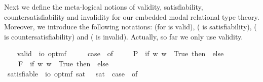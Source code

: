 \begin{isabellebody}
\begin{isamarkuptext}%
Next we define the meta-logical notions of validity, satisfiability, 
  countersatisfiability and invalidity for our embedded modal relational type theory. Moreover, 
  we introduce the following notations: \isa{{\isacharbrackleft}{\isasymphi}{\isacharbrackright}} 
  (for \isa{{\isasymphi}} is valid),  (\isa{{\isasymphi}} is satisfiability),  
  (\isa{{\isasymphi}} is countersatisfiability) and  (\isa{{\isasymphi}} is invalid). Actually, so far 
  we only use validity.%
\end{isamarkuptext}\isamarkuptrue%
\ \ \isamarkupfalse%
\ valid\ {\isacharcolon}{\isacharcolon}\ {\isachardoublequoteopen}io\ opt{\isasymRightarrow}mf{\isachardoublequoteclose}\ {\isacharparenleft}{\isachardoublequoteopen}{\isacharbrackleft}{\isacharunderscore}{\isacharbrackright}{\isachardoublequoteclose}\ {\isacharbrackleft}{}{\isacharbrackright}{\isacharparenright}\ \ {\isachardoublequoteopen}{\isacharbrackleft}{\isasymphi}{\isacharbrackright}\ {\isasymequiv}\ case\ {\isasymphi}\ of\ \isanewline
\ \ \ \ P{\isacharparenleft}{\isasympsi}{\isacharparenright}\ {\isasymRightarrow}\ if\ {\isasymforall}w{\isachardot}{\isacharparenleft}{\isasympsi}\ w{\isacharparenright}\ {\isasymlongleftrightarrow}\ True\ then\ {\isasymtop}\ else\ {\isasymbottom}\ {\isacharbar}\ \isanewline
\ \ \ \ F{\isacharparenleft}{\isasympsi}{\isacharparenright}\ {\isasymRightarrow}\ if\ {\isasymforall}w{\isachardot}{\isacharparenleft}{\isasympsi}\ w{\isacharparenright}\ {\isasymlongleftrightarrow}\ True\ then\ {\isasymtop}\ else\ {\isasymbottom}\ {\isacharbar}\ \isanewline
\ \ \ \ {\isacharunderscore}\ {\isasymRightarrow}\ {\isacharasterisk}{\isachardoublequoteclose}\isanewline
\ \isamarkupfalse%
\ satisfiable\ {\isacharcolon}{\isacharcolon}\ {\isachardoublequoteopen}io\ opt{\isasymRightarrow}mf{\isachardoublequoteclose}\ {\isacharparenleft}{\isachardoublequoteopen}{\isacharbrackleft}{\isacharunderscore}{\isacharbrackright}\isactrlsup s\isactrlsup a\isactrlsup t{\isachardoublequoteclose}\ {\isacharbrackleft}{}{\isacharbrackright}{\isacharparenright}\ \ {\isachardoublequoteopen}{\isacharbrackleft}{\isasymphi}{\isacharbrackright}\isactrlsup s\isactrlsup a\isactrlsup t\ {\isasymequiv}\ case\ {\isasymphi}\ of\ \isanewline

\end{isabellebody}
